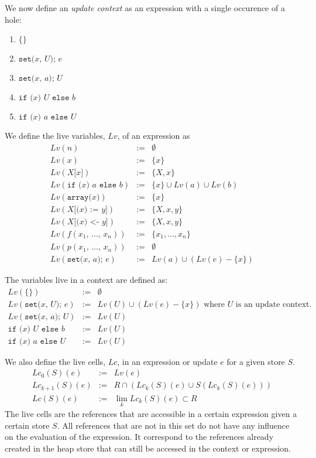 \documentclass[12pt,a4paper]{article}
\newcommand{\cl}[1]{\texttt{#1}}
\newcommand{\ucont}[1]{\{#1\}}
\begin{document}
We now define an \emph{update context} as an expression with a single occurence of a hole:
\begin{enumerate}
\itemsep-0.2em
\item $\ucont{}$
\item $\cl{set(} x \cl{, } U \cl{); } e $
\item $\cl{set(} x \cl{, } a \cl{); } U $
\item $ \cl{if (} x \cl{) } U \cl{ else } b $
\item $ \cl{if (} x \cl{) } a \cl{ else } U $
\end{enumerate}


We define the live variables, $Lv$, of an expression as
\begin{eqnarray*}
Lv( n ) & := & \emptyset \\
Lv( x ) & := & \{ x \} \\
Lv( X\cl{[}x\cl{]} ) & := & \{ X, x \} \\
Lv( \cl{if (} x \cl{) } a \cl{ else } b) & := & \{ x \} \cup Lv(a) \cup Lv(b) \\
Lv( \cl{array(} x \cl{)} ) & := & \{ x \} \\
Lv( X \cl{[(} x \cl{) := } y \cl{]} ) & := & \{ X, x, y \} \\
Lv( X \cl{[(} x \cl{) <- } y \cl{]} ) & := & \{ X, x, y \} \\
Lv( f(x_1 \cl{, } ... \cl{, } x_n) ) & := & \{ x_1, ... , x_n \} \\
Lv( p(x_1 \cl{, } ... \cl{, } x_n) ) & := & \emptyset \\
Lv( \cl{set(} x \cl{, } a \cl{); } e ) &:=& Lv(a) \cup \left( Lv(e) - \{ x \} \right)
\end{eqnarray*}

The variables live in a context are defined as:
\begin{eqnarray*}
Lv(\ucont{} ) &:=& \emptyset \\
Lv( \cl{set(} x \cl{, } U \cl{); } e ) &:=& Lv(U) \cup \left(Lv(e) - \{ x \} \right) \text{ where $U$ is an update context.} \\
Lv( \cl{set(} x \cl{, } a \cl{); } U ) &:=& Lv(U) \\
\cl{if (} x \cl{) } U \cl{ else } b &:=& Lv(U) \\
\cl{if (} x \cl{) } a \cl{ else } U &:=& Lv(U) 
\end{eqnarray*}


We also define the live cells, $Lc$, in an expression or update $e$ for a given store $S$.
\begin{eqnarray*}
Lc_0(S)(e) &:=& Lv(e) \\
Lc_{k+1}(S)(e) &:=& R \cap (Lc_k(S)(e) \cup S( Lc_k(S)(e) ) ) \\
Lc(S)(e) &:=& \lim_k Lc_k(S)(e) \subset R
\end{eqnarray*}
The live cells are the references that are accessible in a certain expression given a certain store $S$. All references that are not in this set do not have any influence on the evaluation of the expression.
It correspond to the references already created in the heap store that can still be accessed in the context or expression.
\end{document}
